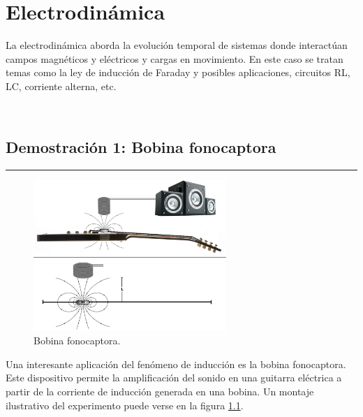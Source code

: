 \chapter{Electrodinámica}
\label{cha:inductance}

La electrodinámica aborda la evolución temporal de sistemas donde 
interactúan campos magnéticos y eléctricos y cargas en movimiento. En este
caso se tratan temas como la ley de inducción de Faraday y posibles 
aplicaciones, circuitos RL, LC, corriente alterna, etc.



\
\section{Demostración 1: Bobina fonocaptora}
\label{sec:DEMO2_01}
\rule{14cm}{0.5mm}

\begin{figure}[htbp]
	\centering
	\includegraphics[width=0.65\textwidth]
	{./pictures/fonocaptor.png}

	\caption{\small{Bobina fonocaptora.}}
	
	\label{fig:fonocaptor}
\end{figure}

Una interesante aplicación del fenómeno de inducción es la bobina 
fonocaptora. Este dispositivo permite la amplificación del sonido en una 
guitarra eléctrica a partir de la corriente de inducción generada en una 
bobina. Un montaje ilustrativo del experimento puede verse en la figura 
\ref{fig:fonocaptor}.

